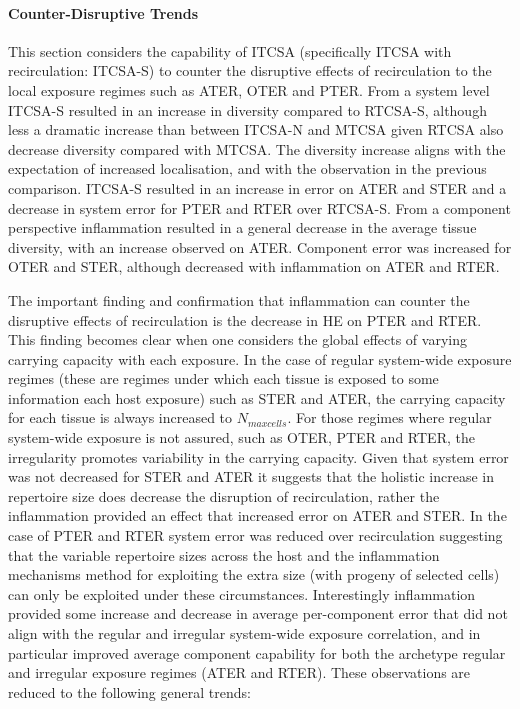 \paragraph{Counter-Disruptive Trends}
This section considers the capability of ITCSA (specifically ITCSA with recirculation: ITCSA-S) to counter the disruptive effects of recirculation to the local exposure regimes such as ATER, OTER and PTER. 
From a system level ITCSA-S resulted in an increase in diversity compared to RTCSA-S, although less a dramatic increase than between ITCSA-N and MTCSA given RTCSA also decrease diversity compared with MTCSA. The diversity increase aligns with the expectation of increased localisation, and with the observation in the previous comparison. ITCSA-S resulted in an increase in error on ATER and STER and a decrease in system error for PTER and RTER over RTCSA-S.
From a component perspective inflammation resulted in a general decrease in the average tissue diversity, with an increase observed on ATER. Component error was increased for OTER and STER, although decreased with inflammation on ATER and RTER.

The important finding and confirmation that inflammation can counter the disruptive effects of recirculation is the decrease in HE on PTER and RTER. This finding becomes clear when one considers the global effects of varying carrying capacity with each exposure. In the case of regular system-wide exposure regimes (these are regimes under which each tissue is exposed to some information each host exposure) such as STER and ATER, the carrying capacity for each tissue is always increased to $N_{maxcells}$. For those regimes where regular system-wide exposure is not assured, such as OTER, PTER and RTER, the irregularity promotes variability in the carrying capacity. Given that system error was not decreased for STER and ATER it suggests that the holistic increase in repertoire size does decrease the disruption of recirculation, rather the inflammation provided an effect that increased error on ATER and STER. In the case of PTER and RTER system error was reduced over recirculation suggesting that the variable repertoire sizes across the host and the inflammation mechanisms method for exploiting the extra size (with progeny of selected cells) can only be exploited under these circumstances. 
Interestingly inflammation provided some increase and decrease in average per-component error that did not align with the regular and irregular system-wide exposure correlation, and in particular improved average component capability for both the archetype regular and irregular exposure regimes (ATER and RTER). These observations are reduced to the following general trends:

